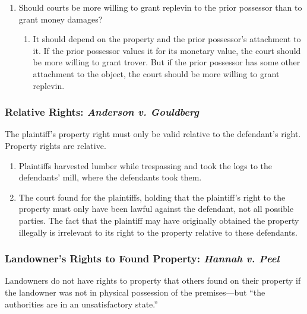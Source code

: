 \begin{enumerate}
    \item Should courts be more willing to grant replevin to the prior 
    possessor than to grant money damages?
    \begin{enumerate}
        \item It should depend on the property and the prior possessor's 
        attachment to it. If the prior possessor values it for its monetary 
        value, the court should be more willing to grant trover. But if the 
        prior possessor has some other attachment to the object, the court 
        should be more willing to grant replevin.
    \end{enumerate}
\end{enumerate}

\subsubsection{Relative Rights: \emph{Anderson v. Gouldberg}}

The plaintiff's property right must only be valid relative to the defendant's 
right. Property rights are relative.

\begin{enumerate}
    \item Plaintiffs harvested lumber while trespassing and took the logs to 
    the defendants' mill, where the defendants took them.
    \item The court found for the plaintiffs, holding that the plaintiff's 
    right to the property must only have been lawful against the defendant, 
    not all possible parties. The fact that the plaintiff may have originally 
    obtained the property illegally is irrelevant to its right to the property 
    relative to these defendants.
\end{enumerate}

\subsubsection{Landowner's Rights to Found Property: \emph{Hannah v. Peel}}

Landowners do not have rights to property that others found on their property 
if the landowner was not in physical possession of the premises---but ``the 
authorities are in an unsatisfactory state.''

